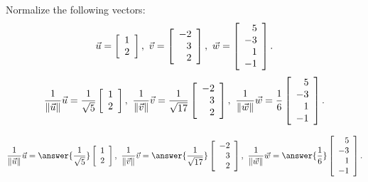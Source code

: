 \documentclass{ximera}
\author{Zack Reed}
\begin{document}
\begin{exercise}

  Normalize the following vectors:
  \begin{equation*}
    \vect{u}=\startmat{r}1\\2\stopmat, \quad
    \vect{v}=\startmat{r}-2\\3\\2\stopmat, \quad
    \vect{w}=\startmat{r}5\\-3\\1\\-1\stopmat.
  \end{equation*}
  \begin{equation*}
    \frac{1}{\norm{\vect{u}}}\vect{u} = \frac{1}{\sqrt{5}}\startmat{r}1\\2\stopmat,\quad
    \frac{1}{\norm{\vect{v}}}\vect{v} = \frac{1}{\sqrt{17}}\startmat{r}-2\\3\\2\stopmat,\quad
    \frac{1}{\norm{\vect{w}}}\vect{w} = \frac{1}{6}\startmat{r}5\\-3\\1\\-1\stopmat.
  \end{equation*}

  \begin{equation*}
    \frac{1}{\norm{\vect{u}}}\vect{u} = \answer{\frac{1}{\sqrt{5}}}\startmat{r}1\\2\stopmat,\quad
    \frac{1}{\norm{\vect{v}}}\vect{v} = \answer{\frac{1}{\sqrt{17}}}\startmat{r}-2\\3\\2\stopmat,\quad
    \frac{1}{\norm{\vect{w}}}\vect{w} = \answer{\frac{1}{6}}\startmat{r}5\\-3\\1\\-1\stopmat.
  \end{equation*}

\end{exercise}
\end{document}
